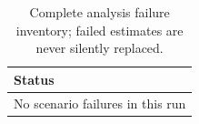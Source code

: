 \begin{table}

\caption{Complete analysis failure inventory; failed estimates are never silently replaced.}
\centering
\begin{tabular}[t]{l}
\toprule
Status\\
\midrule
No scenario failures in this run\\
\bottomrule
\end{tabular}
\end{table}
